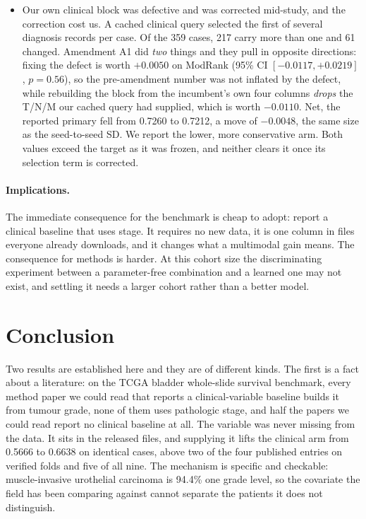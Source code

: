 \documentclass[11pt]{article}
\begin{document}
\begin{itemize}
  \item Our own clinical block was defective and was corrected mid-study, and the
    correction cost us. A cached clinical query selected the first of several diagnosis records per case. Of the 359 cases, 217 carry more than one and 61 changed. Amendment A1 did \emph{two}
    things and they pull in opposite directions: fixing the defect is worth $+0.0050$ on ModRank (95\% CI $[-0.0117,+0.0219]$, $p=0.56$), so the pre-amendment number was not inflated by the defect, while rebuilding the block from the incumbent's own four columns \emph{drops}
    the T/N/M our cached query had supplied, which is worth $-0.0110$. Net, the reported
    primary fell from 0.7260 to 0.7212, a move of $-0.0048$, the same size as the seed-to-seed SD.
    We report the lower, more conservative arm. Both values exceed the target as it was frozen,
    and neither clears it once its selection term is corrected.
\end{itemize}

\paragraph{Implications.} The immediate consequence for the benchmark is cheap to adopt: report a
clinical baseline that uses stage. It requires no new data, it is one column in files everyone
already downloads, and it changes what a multimodal gain means. The consequence for methods is
harder. At this cohort size the discriminating experiment between a parameter-free combination
and a learned one may not exist, and settling it needs a larger cohort rather than a better model.

\clearpage



\section{Conclusion}

Two results are established here and they are of different kinds. The first is a fact about a
literature: on the TCGA bladder whole-slide survival benchmark, every method paper we could read
that reports a clinical-variable baseline builds it from tumour grade, none of them uses pathologic
stage, and half the papers we could read report no clinical baseline at all. The variable was never missing from the
data. It sits in the released files, and supplying it lifts the clinical arm from 0.5666 to 0.6638
on identical cases, above two of the four published entries on verified folds and five of all
nine. The mechanism is specific and
checkable: muscle-invasive urothelial carcinoma is 94.4\% one grade level, so the covariate the
field has been comparing against cannot separate the patients it does not distinguish.
\end{document}
